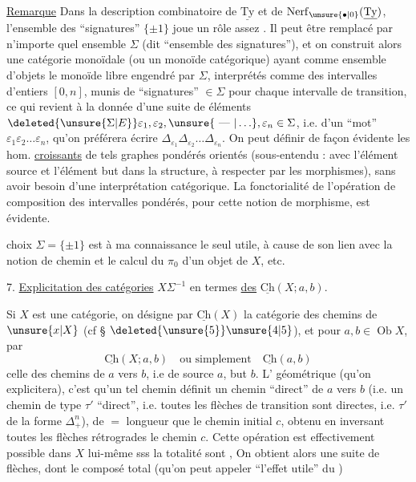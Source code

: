 \uline{Remarque} Dans la description combinatoire de $\underline{\mathrm{Ty}}$ et de $\operatorname{Nerf}_{\unsure{\bullet|0}}(\underline{\mathrm{Ty}})$, l'ensemble des ``signatures'' $\{\pm1\}$ joue un rôle assez . Il peut être remplacé par n'importe quel ensemble $\Sigma$ (dit ``ensemble des signatures''), et  on construit alors une catégorie monoïdale (ou un monoïde catégorique) ayant comme ensemble d'objets le monoïde libre engendré par $\Sigma$, interprétés comme des intervalles d'entiers $[0,n]$, munis de ``signatures'' $\in\Sigma$ pour chaque intervalle de transition,  ce qui revient à la donnée d'une suite  de  éléments $\deleted{\unsure{\Sigma|E}}\varepsilon_1,\varepsilon_2,\unsure{\text{ --- }|\ldots},\varepsilon_n\in\Sigma$, i.e. d'un ``mot'' $\varepsilon_1\varepsilon_2\ldots\varepsilon_n$, qu'on préférera écrire $\Delta_{\varepsilon_1}\Delta_{\varepsilon_2}\ldots\Delta_{\varepsilon_n}$. On peut définir de façon évidente les hom. \uline{croissants} de tels graphes pondérés orientés (sous-entendu : avec l'élément source et l'élément but dans la structure, à respecter par les morphismes), sans avoir besoin d'une interprétation catégorique. La fonctorialité de l'opération de composition des intervalles pondérés, pour cette notion de morphisme, est évidente. 


choix $\Sigma=\{\pm1\}$ est  à ma connaissance le seul utile, à cause de son lien avec la notion de chemin et le calcul du $\pi_0$ d'un objet de $X$, etc.

7. \uline{Explicitation des catégories}  $X\Sigma^{-1}$ en termes \uline{des} $\underline{\mathrm{Ch}}(X;a,b)$.

Si $X$ est une catégorie, on désigne par $\underline{\mathrm{Ch}}(X)$ la catégorie des chemins de $\unsure{x|X}$ (cf \S{} $\deleted{\unsure{5}}\unsure{4|5}$), et pour $a,b\in\operatorname{Ob}X$, par
\[
\underline{\mathrm{Ch}}(X;a,b)\quad\text{ou simplement}\quad\underline{\mathrm{Ch}}(a,b)
\]
celle des chemins de $a$ vers $b$, i.e de source $a$, but $b$. L' géométrique (qu'on explicitera), c'est qu'un tel chemin  définit un chemin ``direct'' de $a$ vers $b$ (i.e. un chemin de type $\tau'$  ``direct'', i.e.  toutes les flèches de transition sont directes, i.e. $\tau'$ de la forme $\Delta_+^n$), de $=$ longueur que le chemin initial $c$, obtenu en inversant toutes les flèches rétrogrades  le chemin $c$. Cette opération est effectivement possible dans $X$ lui-même sss la totalité  sont , On obtient alors une suite  de flèches, dont le composé total  (qu'on peut appeler ``l'effet utile'' du )

